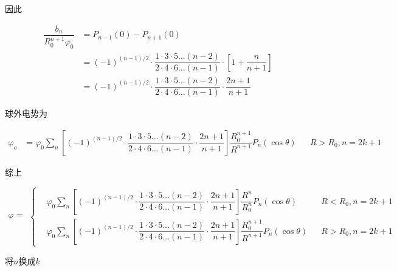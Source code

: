 \documentclass{article}
\begin{document}
因此

\begin{equation*}
  \begin{aligned}
    \dfrac{b_n}{R_0^{n+1} \varphi_0}  &=
    P_{n-1} \left( 0 \right) - P_{n+1} \left( 0 \right) \\
    &= \left( -1  \right)^{\left( n-1 \right)/ 2} \cdot \dfrac{1 \cdot 3 \cdot 5 \dots \left( n-2 \right)}{2 \cdot 4 \cdot 6 \dots \left( n-1 \right)} \cdot \left[ 1 + \dfrac{n}{n+1}  \right] \\
    &= \left( -1  \right)^{\left( n-1 \right)/ 2} \cdot \dfrac{1 \cdot 3 \cdot 5 \dots \left( n-2 \right)}{2 \cdot 4 \cdot 6 \dots \left( n-1 \right)} \cdot \dfrac{2n+1}{n+1}
  \end{aligned}
\end{equation*}

球外电势为

\begin{equation*}
  \begin{aligned}
    \varphi_o &= \varphi_0 \sum_n \left[ \left( -1  \right)^{\left( n-1 \right)/ 2} \cdot \dfrac{1 \cdot 3 \cdot 5 \dots \left( n-2 \right)}{2 \cdot 4 \cdot 6 \dots \left( n-1 \right)} \cdot \dfrac{2n+1}{n+1}
 \right] \dfrac{R_0^{n+1}}{R^{n+1}}  P_n \left( \cos \theta \right) && R>R_0, n=2k+1
  \end{aligned}
\end{equation*}

综上

\begin{equation*}
  \begin{aligned}
    \varphi = 
  \end{aligned}
  \left\{
  \begin{aligned}
    &\varphi_0 \sum_n \left[ \left( -1  \right)^{\left( n-1 \right)/ 2} \cdot \dfrac{1 \cdot 3 \cdot 5 \dots \left( n-2 \right)}{2 \cdot 4 \cdot 6 \dots \left( n-1 \right)} \cdot \dfrac{2n+1}{n+1}
 \right] \dfrac{R^n}{R_0^n}  P_n \left( \cos \theta \right) && R<R_0, n=2k+1 \\
    &\varphi_0 \sum_n \left[ \left( -1  \right)^{\left( n-1 \right)/ 2} \cdot \dfrac{1 \cdot 3 \cdot 5 \dots \left( n-2 \right)}{2 \cdot 4 \cdot 6 \dots \left( n-1 \right)} \cdot \dfrac{2n+1}{n+1}
 \right] \dfrac{R_0^{n+1}}{R^{n+1}}  P_n \left( \cos \theta \right) && R>R_0, n=2k+1
  \end{aligned}
  \right.
\end{equation*}

将$n$换成$k$
\end{document}
